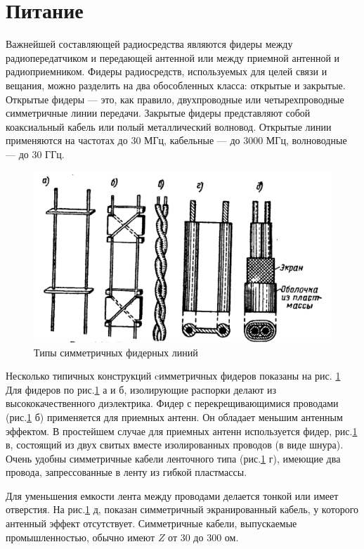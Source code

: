 \section{Питание}

Важнейшей составляющей радиосредства являются фидеры между радиопередатчиком и передающей антенной или между приемной антенной и радиоприемником. Фидеры радиосредств, используемых для целей связи и вещания, можно разделить на два обособленных класса: открытые и закрытые. Открытые фидеры — это, как правило, двухпроводные или четырехпроводные симметричные линии передачи. Закрытые фидеры представляют собой коаксиальный кабель или полый металлический волновод. Открытые линии применяются на частотах до 30 МГц, кабельные — до 3000 МГц, волноводные — до 30 ГГц.

\begin{figure}[H]
    \centering
    \includegraphics[width=.9\textwidth]{img/fider_types.png}
    \caption{Типы симметричных фидерных линий}
    \label{fig:fider_types}
\end{figure}

Несколько типичных конструкций cимметричных фидеров показаны на рис. \ref{fig:fider_types} Для фидеров по рис.\ref{fig:fider_types} а и б, изолирующие распорки делают из высококачественного диэлектрика. Фидер с перекрещивающимися проводами (рис.\ref{fig:fider_types} б) применяется для приемных антенн. Он обладает меньшим антенным эффектом. В простейшем случае для приемных антенн используется фидер, рис.\ref{fig:fider_types} в, состоящий из двух свитых вместе изолированных проводов (в виде шнура). Очень удобны симметричные кабели ленточного типа (рис.\ref{fig:fider_types} г), имеющие два провода, запрессованные в ленту из гибкой пластмассы.

Для уменьшения емкости лента между проводами делается тонкой или имеет отверстия. На рис.\ref{fig:fider_types} д, показан симметричный экранированный кабель, у которого антенный эффект отсутствует. Симметричные кабели, выпускаемые промышленностью, обычно имеют $Z$ от 30 до 300 ом.


